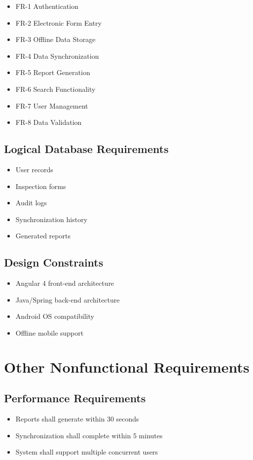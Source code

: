 \documentclass[12pt]{article}
\begin{document}
\begin{itemize}
\item FR-1 Authentication
\item FR-2 Electronic Form Entry
\item FR-3 Offline Data Storage
\item FR-4 Data Synchronization
\item FR-5 Report Generation
\item FR-6 Search Functionality
\item FR-7 User Management
\item FR-8 Data Validation
\end{itemize}

\subsection{Logical Database Requirements}

\begin{itemize}
\item User records
\item Inspection forms
\item Audit logs
\item Synchronization history
\item Generated reports
\end{itemize}

\subsection{Design Constraints}

\begin{itemize}
\item Angular 4 front-end architecture
\item Java/Spring back-end architecture
\item Android OS compatibility
\item Offline mobile support
\end{itemize}

\section{Other Nonfunctional Requirements}

\subsection{Performance Requirements}

\begin{itemize}
\item Reports shall generate within 30 seconds
\item Synchronization shall complete within 5 minutes
\item System shall support multiple concurrent users
\end{itemize}
\end{document}
